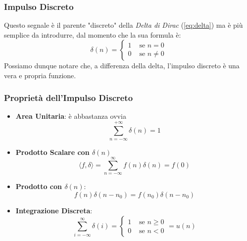 \subsubsection{Impulso Discreto}
Questo segnale è il parente "discreto" della \textit{Delta di Dirac} (\ref{eq:delta}) ma è più semplice da introdurre, dal momento che la sua formula è:
\begin{equation}
    \delta(n) = \begin{cases}
        1 & \mbox{ se } n = 0\\
        0 & \mbox{ se } n \neq 0
    \end{cases}
\end{equation}
Possiamo dunque notare che, a differenza della delta, l'impulso discreto è una vera e propria funzione.

\subsubsection{Proprietà dell'Impulso Discreto}
\begin{itemize}
    \item \textbf{Area Unitaria}: è abbastanza ovvia
    \begin{equation}
        \sum_{n=-\infty}^{+\infty} \delta(n) = 1
    \end{equation}

    \item \textbf{Prodotto Scalare con $\delta(n)$} 
    \begin{equation}
        \langle f,\delta \rangle = \sum_{n= -\infty}^{\infty} f(n)\delta(n) = f(0) 
    \end{equation}

    \item \textbf{Prodotto con $\delta(n)$}:
    \begin{equation}
        f(n)\delta(n - n_0) = f(n_0)\delta(n - n_0)
    \end{equation}

    \item \textbf{Integrazione Discreta}:
    \begin{equation}
        \sum_{i = -\infty}^{\infty} \delta(i) = \begin{cases}
            1 & \mbox{ se } n \geq 0\\
            0 & \mbox{ se } n < 0
        \end{cases} = u(n)
    \end{equation}
\end{itemize}


